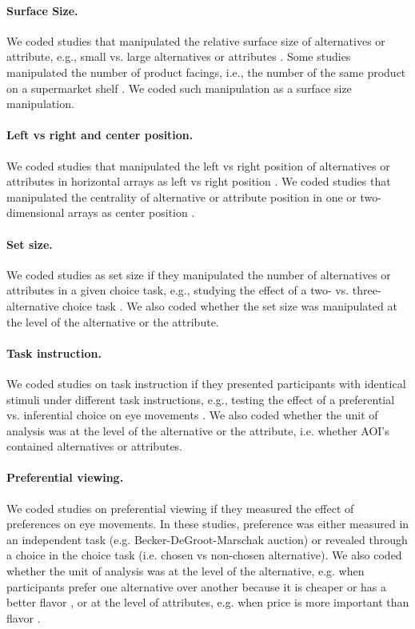 \documentclass[english,natbib,man,floatsintext]{apa6}
\begin{document}
\paragraph{Surface Size.} We coded studies that manipulated the relative surface size of alternatives or attribute, e.g., small vs. large alternatives or attributes \citep{lohse1997a}. Some studies manipulated the number of product facings, i.e., the number of the same product on a supermarket shelf \citep{chandon2009a}. We coded such manipulation as a surface size manipulation. 

\paragraph{Left vs right and center position.} We coded studies that manipulated the left vs right position of alternatives or attributes in horizontal arrays as left vs right position \citep{kreplin2014a}. We coded studies that manipulated the centrality of alternative or attribute position in one or two-dimensional arrays as center position \citep[experiment 1A \& 1B in][]{atalay2012a,meissner2016a}.

\paragraph{Set size.} We coded studies as set size if they manipulated the number of alternatives or attributes in a given choice task, e.g., studying the effect of a two- vs. three-alternative choice task \citep{hong2016a}. We also coded whether the set size was manipulated at the level of the alternative or the attribute. 

\paragraph{Task instruction.} We coded studies on task instruction if they presented participants with identical stimuli under different task instructions, e.g., testing the effect of a preferential  vs. inferential choice on eye movements \citep{orquin2019a}. We also coded whether the unit of analysis was at the level of the alternative or the attribute, i.e. whether AOI's contained alternatives or attributes. 

\paragraph{Preferential viewing.} We coded studies on preferential viewing if they measured the effect of preferences on eye movements. In these studies, preference was either measured in an independent task (e.g. Becker-DeGroot-Marschak auction) or revealed through a choice in the choice task (i.e. chosen vs non-chosen alternative). We also coded whether the unit of analysis was at the level of the alternative, e.g. when participants prefer one alternative over another because it is cheaper or has a better flavor \citep{gidloef2017a}, or at the level of attributes, e.g. when price is more important than flavor \citep{meissner2016a}. 
\end{document}

